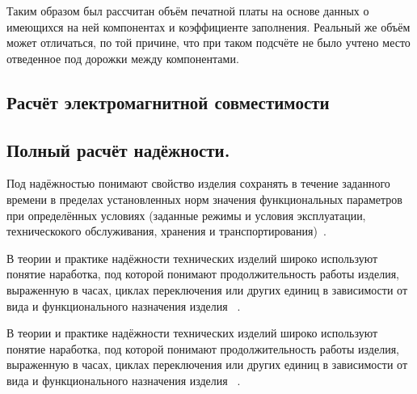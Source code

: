   Таким образом был рассчитан объём печатной платы на основе данных о
имеющихся на ней компонентах и коэффициенте заполнения.  Реальный же
объём может отличаться, по той причине, что при таком подсчёте не было
учтено место отведенное под дорожки между компонентами.


\subsection{Расчёт электромагнитной совместимости}


\subsection{Полный расчёт надёжности. }


Под надёжностью понимают свойство изделия сохранять в течение
заданного времени в пределах установленных норм значения
функциональных параметров при определённых условиях (заданные режимы и
условия эксплуатации, техническокого обслуживания, хранения и
транспортирования)~\cite{Borovikov2010}.

В теории и практике надёжности технических изделий широко используют
понятие наработка, под которой понимают продолжительность работы
изделия, выраженную в часах, циклах переключения или других единиц в
зависимости от вида и функционального назначения изделия ~\cite{Borovikov2010}.

В теории и практике надёжности технических изделий широко используют
понятие наработка, под которой понимают продолжительность работы
изделия, выраженную в часах, циклах переключения или других единиц в
зависимости от вида и функционального назначения изделия ~\cite{Borovikov2010}.

